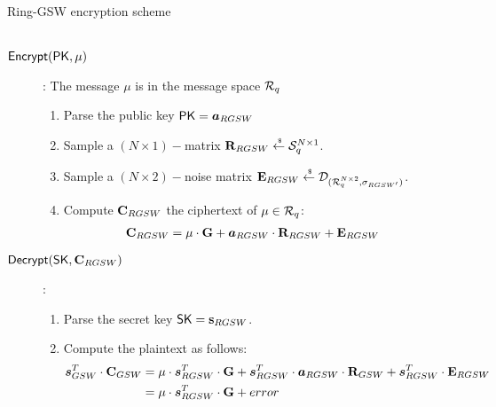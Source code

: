 \begin{subsection}{Ring-GSW encryption scheme~\cite{DBLP:journals/tc/KhedrGV16}}
\begin{description}
\begin{enumerate}
\begin{align*}
      \end{align*}
    \end{enumerate}
  \item[${\mathsf{Encrypt}}(\mathsf{PK}, \mu)$]: The message $\mu$ is in the message space ${\mathcal{R}}_q$
    \begin{enumerate}
    \item Parse the public key $\PK = \vec{a}_{RGSW}$
    \item Sample a $(N \times 1)-$matrix $\mathbf{R}_{RGSW} \stackrel{{\scriptscriptstyle \mkern4mu \$}}{\gets} \mathcal{S}_q^{N \times 1}$.
    \item Sample a $(N \times 2)-$noise matrix $\mathbf{E}_{RGSW} \stackrel{{\scriptscriptstyle \mkern4mu \$}}{\gets} \mathcal{D}_{({\mathcal{R}}_q^{N \times 2}, \sigma_{RGSW'})}$.
    \item Compute $\mathbf{C}_{RGSW}$ the ciphertext of $\mu \in {\mathcal{R}}_q$:
      \begin{align*}
        \mat{C}_{RGSW} &= \mu \cdot \mat{G} + \vec{a}_{RGSW} \cdot \mat{R}_{RGSW} + \mat{E}_{RGSW}
      \end{align*}
    \end{enumerate}
  \item[${\mathsf{Decrypt}}(\mathsf{SK}, \mathbf{C}_{RGSW})$]:
    \begin{enumerate}
    \item Parse the secret key $\mathsf{SK} = \mathbf{s}_{RGSW}$.
    \item Compute the plaintext as follows:
      \begin{align*}
        \vec{s}_{GSW}^T \cdot \mat{C}_{GSW} &= \mu \cdot \vec{s}_{RGSW}^T \cdot \mat{G} + \vec{s}_{RGSW}^T \cdot \vec{a}_{RGSW} \cdot \mat{R}_{GSW} + \vec{s}_{RGSW}^T \cdot \mat{E}_{RGSW}\\
        &= \mu \cdot \vec{s}_{RGSW}^T \cdot \mat{G} + error
      \end{align*}

    \end{enumerate}
  \end{description}

\end{subsection}

